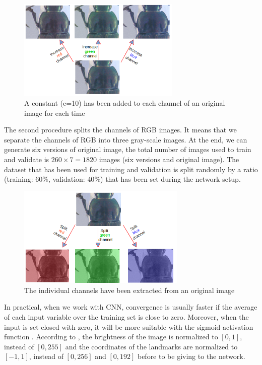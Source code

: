 \documentclass{article} %
\begin{document}
\begin{multicols}{2}
\begin{figure}[H]
	\centerline{\includegraphics[height=1.9in]{images/inc_channels.png}}
	\caption{A constant (c=10) has been added to each channel of an original image for each time}
	\label{figpronotum}
\end{figure}

The second procedure splits the channels of RGB images. It means that we separate the channels of RGB into three gray-scale images. At the end, we can generate six versions of original image, the total number of images used to train and validate is $260 \times 7 = 1820$ images (six versions and original image). The dataset that has been used for training and validation is split randomly by a ratio (training: $60\%$, validation: $40\%$) that has been set during the network setup.

\begin{figure}[H]
	\centerline{\includegraphics[height=1.9in]{images/sp_channels.png}}
	\caption{The individual channels have been extracted from an original image}
	\label{figpronotum2}
\end{figure}

In practical, when we work with CNN, convergence is usually faster if the average of each input variable over the training set is close to zero. Moreover, when the input is set closed with zero, it will be more suitable with the sigmoid activation function \cite{lecun2012efficient}. According to \cite{lecun2012efficient}, the brightness of the image is normalized to $[0,1]$, instead of $[0,255]$ and the coordinates of the landmarks are normalized to $[-1,1]$, instead of $[0,256]$ and $[0,192]$ before to be giving to the network.

\end{multicols}
\end{document}
